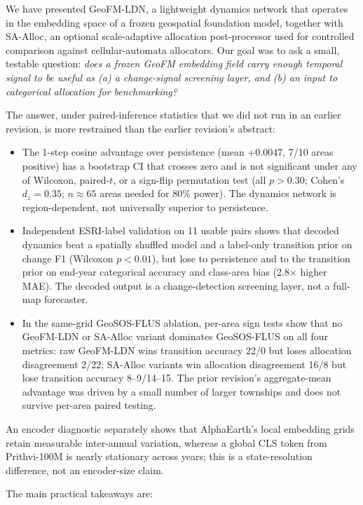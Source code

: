 \documentclass{article}
\begin{document}
We have presented GeoFM-LDN, a lightweight dynamics network that operates in the embedding space of a frozen geospatial foundation model, together with SA-Alloc, an optional scale-adaptive allocation post-processor used for controlled comparison against cellular-automata allocators. Our goal was to ask a small, testable question: \emph{does a frozen GeoFM embedding field carry enough temporal signal to be useful as (a) a change-signal screening layer, and (b) an input to categorical allocation for benchmarking?}

The answer, under paired-inference statistics that we did not run in an earlier revision, is more restrained than the earlier revision's abstract:

\begin{itemize}
\item The 1-step cosine advantage over persistence (mean $+0.0047$, 7/10 areas positive) has a bootstrap CI that crosses zero and is not significant under any of Wilcoxon, paired-$t$, or a sign-flip permutation test (all $p>0.30$; Cohen's $d_z=0.35$; $n\approx 65$ areas needed for 80\% power). The dynamics network is region-dependent, not universally superior to persistence.
\item Independent ESRI-label validation on 11 usable pairs shows that decoded dynamics beat a spatially shuffled model and a label-only transition prior on change F1 (Wilcoxon $p<0.01$), but lose to persistence and to the transition prior on end-year categorical accuracy and class-area bias (2.8$\times$ higher MAE). The decoded output is a change-detection screening layer, not a full-map forecaster.
\item In the same-grid GeoSOS-FLUS ablation, per-area sign tests show that no GeoFM-LDN or SA-Alloc variant dominates GeoSOS-FLUS on all four metrics: raw GeoFM-LDN wins transition accuracy 22/0 but loses allocation disagreement 2/22; SA-Alloc variants win allocation disagreement 16/8 but lose transition accuracy 8--9/14--15. The prior revision's aggregate-mean advantage was driven by a small number of larger townships and does not survive per-area paired testing.
\end{itemize}

An encoder diagnostic separately shows that AlphaEarth's local embedding grids retain measurable inter-annual variation, whereas a global CLS token from Prithvi-100M is nearly stationary across years; this is a state-resolution difference, not an encoder-size claim.

The main practical takeaways are:
\end{document}
